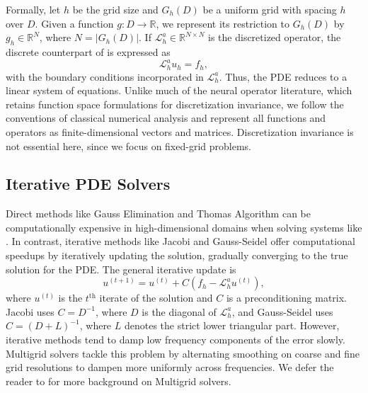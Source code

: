 \documentclass{article} %
\begin{document}
Formally, let $h$ be the grid size and $G_h(D)$ be a uniform grid with spacing $h$ over $D$. Given a function $g: D \to \mathbb{R}$, we represent its restriction to $G_h(D)$ by $g_h \in \mathbb{R}^N$,
where $N = |G_h(D)|$. If $\mathcal{L}_h^a \in \mathbb{R}^{N \times N}$ is the discretized operator, the discrete counterpart of  is expressed as
\begin{equation} \label{eq:mainpdediscrete}
    \mathcal{L}_h^au_h = f_h,
\end{equation}
with the boundary conditions incorporated in $\mathcal{L}_h^a$. Thus, the PDE reduces to a linear system of equations. Unlike much of the neural operator literature, which retains function space formulations for discretization invariance, we follow the conventions of classical numerical analysis and represent all functions and operators as finite-dimensional vectors and matrices. Discretization invariance is not essential here, since we focus on fixed-grid problems.

\subsection{Iterative PDE Solvers} \label{sec:finitedifference}
Direct methods like Gauss Elimination and Thomas Algorithm can be computationally expensive in high-dimensional domains when solving systems like .
In contrast, iterative methods like Jacobi and Gauss-Seidel offer computational speedups by iteratively updating the solution, gradually converging to the true solution for the PDE. The general iterative update is
\begin{equation}\label{eq:iterativeupdate}
    u^{(t + 1)} = u^{(t)} + C\left(f_h - \mathcal{L}_h^au^{(t)}\right),
\end{equation}
where $u^{(t)}$ is the $t^{\text{th}}$ iterate of the solution and $C$ is a preconditioning matrix. Jacobi uses $C = D^{-1}$, where $D$ is the diagonal of $\mathcal{L}_h^a$, and Gauss-Seidel uses $C = (D + L)^{-1}$, where $L$ denotes the strict lower triangular part. 
However, iterative methods tend to damp low frequency components of the error slowly. Multigrid solvers \citep{briggs2000multigrid,trottenberg2001multigrid,hackbusch2013multi} 
tackle this problem by alternating smoothing
on coarse and fine grid resolutions to dampen more uniformly across frequencies. We defer the reader to  for more background on Multigrid solvers.
\end{document}
